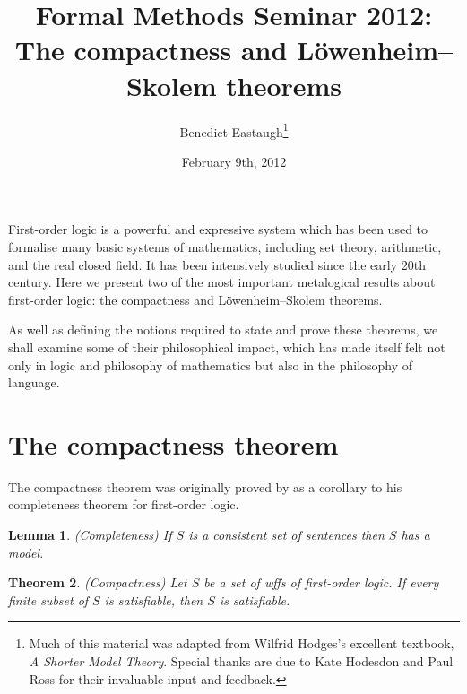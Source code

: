 \documentclass[10pt, a4paper, oneside]{article}
\title{Formal Methods Seminar 2012:\\
       The compactness and Löwenheim--Skolem theorems}
\author{Benedict Eastaugh\footnote{Much of this material was adapted from
        Wilfrid Hodges's excellent textbook, \emph{A Shorter Model Theory}.
        Special thanks are due to Kate Hodesdon and Paul Ross for their
        invaluable input and feedback.}}
\date{February 9th, 2012}
\newtheorem{thm}{Theorem}[section]
\theoremstyle{definition}
\theoremstyle{remark}
\theoremstyle{plain}
\newtheorem{lem}[thm]{Lemma}
\theoremstyle{plain}
\begin{document}
\maketitle

First-order logic is a powerful and expressive system which has been used to
formalise many basic systems of mathematics, including set theory, arithmetic,
and the real closed field. It has been intensively studied since the early 20th
century. Here we present two of the most important metalogical results about
first-order logic: the compactness and Löwenheim--Skolem theorems.

As well as defining the notions required to state and prove these theorems, we
shall examine some of their philosophical impact, which has made itself felt not
only in logic and philosophy of mathematics but also in the philosophy of
language.


\section{The compactness theorem}

The compactness theorem was originally proved by \citet{godel1930} as a
corollary to his completeness theorem for first-order logic.

\begin{lem}
    \label{completeness}
    (Completeness)
    If $S$ is a consistent set of sentences then $S$ has a model.
\end{lem}

\begin{thm}
    \label{compactness}
    (Compactness)
    Let $S$ be a set of wffs of first-order logic. If every finite subset of $S$
    is satisfiable, then $S$ is satisfiable.
\end{thm}
\end{document}

